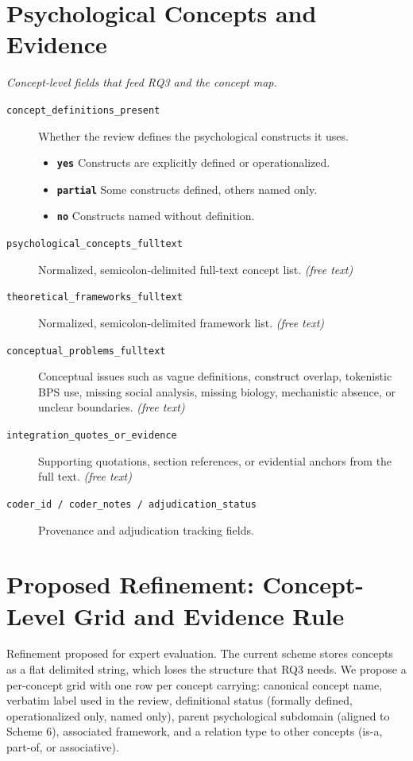 \documentclass[11pt]{article}
\begin{document}
\section*{Psychological Concepts and Evidence}
{\small\itshape Concept-level fields that feed RQ3 and the concept map.}\par\smallskip
\begin{description}
\item[\texttt{concept\_definitions\_present}] Whether the review defines the psychological constructs it uses.
  \begin{itemize}[leftmargin=1.3em,itemsep=2pt,topsep=2pt]
  \item \textbf{\texttt{yes}} Constructs are explicitly defined or operationalized.
  \item \textbf{\texttt{partial}} Some constructs defined, others named only.
  \item \textbf{\texttt{no}} Constructs named without definition.
  \end{itemize}
\item[\texttt{psychological\_concepts\_fulltext}] Normalized, semicolon-delimited full-text concept list. \textit{(free text)}
\item[\texttt{theoretical\_frameworks\_fulltext}] Normalized, semicolon-delimited framework list. \textit{(free text)}
\item[\texttt{conceptual\_problems\_fulltext}] Conceptual issues such as vague definitions, construct overlap, tokenistic BPS use, missing social analysis, missing biology, mechanistic absence, or unclear boundaries. \textit{(free text)}
\item[\texttt{integration\_quotes\_or\_evidence}] Supporting quotations, section references, or evidential anchors from the full text. \textit{(free text)}
\item[\texttt{coder\_id / coder\_notes / adjudication\_status}] Provenance and adjudication tracking fields.
\end{description}

\section*{Proposed Refinement: Concept-Level Grid and Evidence Rule}
Refinement proposed for expert evaluation. The current scheme stores concepts as a flat delimited string, which loses the structure that RQ3 needs. We propose a per-concept grid with one row per concept carrying: canonical concept name, verbatim label used in the review, definitional status (formally defined, operationalized only, named only), parent psychological subdomain (aligned to Scheme 6), associated framework, and a relation type to other concepts (is-a, part-of, or associative).
\end{document}
